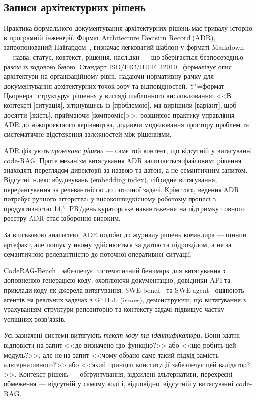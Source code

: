 
\subsection{Записи архітектурних рішень}
\label{sec:related-adr}

Практика формального документування архітектурних рішень має тривалу історію в програмній інженерії.
Формат Architecture Decision Record (ADR), запропонований Найґардом~\citep{nygard2011adr}, визначає легковагий шаблон у форматі Markdown --- назва, статус, контекст, рішення, наслідки --- що зберігається безпосередньо разом із кодовою базою.
Стандарт ISO/IEC/IEEE~42010~\citep{iso42010} формалізує опис архітектури на організаційному рівні, надаючи нормативну рамку для документування архітектурних точок зору та відповідностей.
Y"=формат Цьорнера~\citep{zorner2015softwarearchitekturen} структурує рішення у вигляді шаблонного висловлювання: <<В контексті [ситуація], зіткнувшись із [проблемою], ми вирішили [варіант], щоб досягти [якість], приймаючи [компроміс]>>.
\citet{zimmermann2015architectural} розширює практику управління ADR до міжпроєктного керівництва, додаючи моделювання простору проблем та систематичне відстеження залежностей між рішеннями.

ADR фіксують \emph{провенанс рішень} --- саме той контент, що відсутній у витягуванні code-RAG.
Проте механізм витягування ADR залишається файловим: рішення знаходять переглядом директорії за назвою та датою, а не семантичним запитом.
Відсутні індекс вбудовувань (embedding index), гібридне витягування, перерангування за релевантністю до поточної задачі.
Крім того, ведення ADR потребує ручного авторства: у високошвидкісному робочому процесі з продуктивністю 14,7~PR/день кураторське навантаження на підтримку повного реєстру ADR стає заборонно високим.

За військовою аналогією, ADR подібні до журналу рішень командира --- цінний артефакт, але пошук у ньому здійснюється за датою та підрозділом, а не за семантичною релевантністю до поточної оперативної ситуації.


CodeRAG-Bench~\citep{wang2024coderagbench} забезпечує систематичний бенчмарк для витягування з доповненою генерацією коду, охоплюючи документацію, довідники API та приклади коду як джерела витягування.
SWE-bench~\citep{jimenez2024swebench} та SWE-agent~\citep{yang2024sweagent} оцінюють агентів на реальних задачах з GitHub (issues), демонструючи, що витягування з урахуванням структури репозиторію та контексту задачі підвищує частку успішних розв'язків.

Усі зазначені системи витягують \emph{текст коду та ідентифікатори}.
Вони здатні відповісти на запит <<де визначено цю функцію?>> або <<що робить цей модуль?>>, але не на запит <<чому обрано саме такий підхід замість альтернативного?>> або <<який принцип конституції забезпечує цей валідатор?>>.
Контекст рішень --- обґрунтування, відхилені альтернативи, перехресні обмеження --- відсутній у самому коді і, відповідно, відсутній у витягуванні code-RAG.
